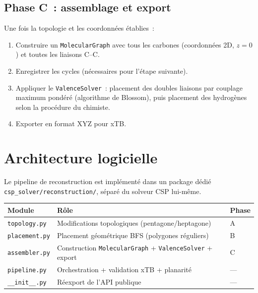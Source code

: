 \documentclass[12pt,a4paper]{article}
\theoremstyle{definition}
\theoremstyle{remark}
\begin{document}
\subsection{Phase C~: assemblage et export}

Une fois la topologie et les coordonn\'ees \'etablies~:
\begin{enumerate}[nosep]
  \item Construire un \texttt{MolecularGraph} avec tous les carbones
        (coordonn\'ees 2D, $z = 0$) et toutes les liaisons C--C.
  \item Enregistrer les cycles (n\'ecessaires pour l'\'etape suivante).
  \item Appliquer le \texttt{ValenceSolver}~: placement des doubles
        liaisons par couplage maximum pond\'er\'e (algorithme de Blossom),
        puis placement des hydrog\`enes selon la proc\'edure du chimiste.
  \item Exporter en format XYZ pour xTB.
\end{enumerate}


\section{Architecture logicielle}

Le pipeline de reconstruction est impl\'ement\'e dans un package d\'edi\'e
\texttt{csp\_solver/reconstruction/}, s\'epar\'e du solveur CSP
lui-m\^eme.

\begin{center}
\begin{tabular}{lll}
\toprule
\textbf{Module} & \textbf{R\^ole} & \textbf{Phase} \\
\midrule
\texttt{topology.py}  & Modifications topologiques (pentagone/heptagone) & A \\
\texttt{placement.py}  & Placement g\'eom\'etrique BFS (polygones r\'eguliers) & B \\
\texttt{assembler.py}  & Construction \texttt{MolecularGraph} + \texttt{ValenceSolver} + export & C \\
\texttt{pipeline.py}   & Orchestration + validation xTB + planarit\'e & --- \\
\texttt{\_\_init\_\_.py}  & R\'eexport de l'API publique & --- \\
\bottomrule
\end{tabular}
\end{center}
\end{document}
